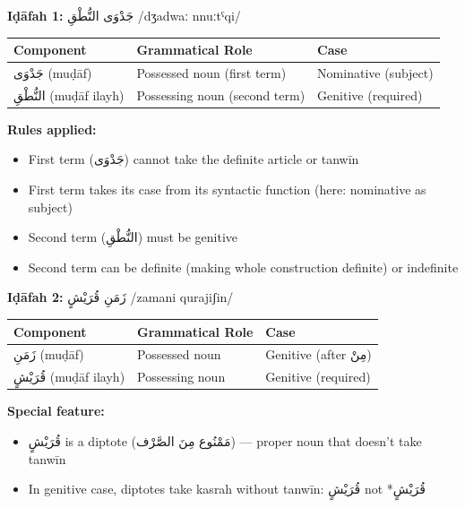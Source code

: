 \documentclass[letterpaper,12pt]{article}
\begin{document}
\begin{tcolorbox}[colback=boxcolor,colframe=headercolor,breakable]
\textbf{Iḍāfah 1:} \textarabic{جَدْوَى النُّطْقِ} /dʒadwaː nnuːtˤqi/

\begin{tabular}{|l|l|l|}
\hline
\textbf{Component} & \textbf{Grammatical Role} & \textbf{Case} \\
\hline
\textarabic{جَدْوَى} (muḍāf) & Possessed noun (first term) & Nominative (subject) \\
\textarabic{النُّطْقِ} (muḍāf ilayh) & Possessing noun (second term) & Genitive (required) \\
\hline
\end{tabular}

\vspace{0.5em}
\textbf{Rules applied:}
\begin{itemize}
\item First term (\textarabic{جَدْوَى}) cannot take the definite article or tanwīn
\item First term takes its case from its syntactic function (here: nominative as subject)
\item Second term (\textarabic{النُّطْقِ}) must be genitive
\item Second term can be definite (making whole construction definite) or indefinite
\end{itemize}

\vspace{1em}
\textbf{Iḍāfah 2:} \textarabic{زَمَنِ قُرَيْشٍ} /zamani qurajiʃin/

\begin{tabular}{|l|l|l|}
\hline
\textbf{Component} & \textbf{Grammatical Role} & \textbf{Case} \\
\hline
\textarabic{زَمَنِ} (muḍāf) & Possessed noun & Genitive (after \textarabic{مِنْ}) \\
\textarabic{قُرَيْشٍ} (muḍāf ilayh) & Possessing noun & Genitive (required) \\
\hline
\end{tabular}

\vspace{0.5em}
\textbf{Special feature:}
\begin{itemize}
\item \textarabic{قُرَيْشٍ} is a diptote (\textarabic{مَمْنُوع مِنَ الصَّرْف}) — proper noun that doesn't take tanwīn
\item In genitive case, diptotes take kasrah without tanwīn: \textarabic{قُرَيْشٍ} not \textarabic{*قُرَيْشٍ}
\end{itemize}
\end{tcolorbox}
\end{document}
